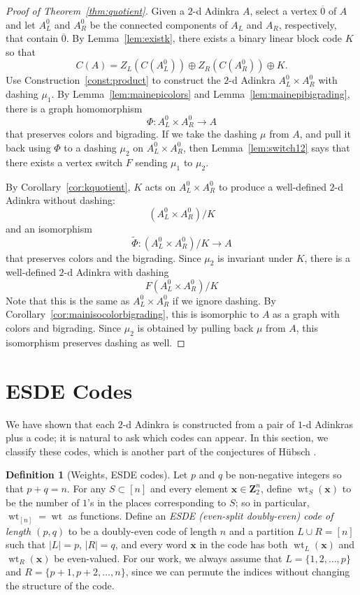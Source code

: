 \documentclass[12pt,twoside,singlespace]{article}
\numberwithin{equation}{section}
\theoremstyle{definition}
\newtheorem{definition}[equation]{Definition}
\newcommand{\ZZ}{\mathbf{Z}}
\newcommand{\on}{\operatorname}
\newcommand{\wt}{\on{wt}}
\renewcommand{\vec}[1]{\mathbf{#1}}
\begin{document}
\begin{proof}[Proof of Theorem~\ref{thm:quotient}]
Given a $2$-d Adinkra $A$, select a vertex $\overline{0}$ of $A$ and let $A_L^0$ and $A_R^0$ be the connected components of $A_L$ and $A_R$, respectively, that contain $\overline{0}$.  By Lemma~\ref{lem:existk}, there exists a binary linear block code $K$ so that
\[C(A)=Z_L(C(A_L^0))\oplus Z_R(C(A_R^0))\oplus K.
\]
Use Construction~\ref{const:product} to construct the $2$-d Adinkra $A_L^0\times A_R^0$ with dashing $\mu_1$.
By Lemma~\ref{lem:mainepicolors} and Lemma~\ref{lem:mainepibigrading}, there is a graph homomorphism
\[\Phi:A_L^0\times A_R^0 \to A\]
that preserves colors and bigrading.  If we take the dashing $\mu$ from $A$, and pull it back using $\Phi$ to a dashing $\mu_2$ on $A_L^0\times A_R^0$, then Lemma~\ref{lem:switch12} says that there exists a vertex switch $F$ sending $\mu_1$ to $\mu_2$.

By Corollary~\ref{cor:kquotient}, $K$ acts on $A_L^0\times A_R^0$ to produce a well-defined $2$-d Adinkra without dashing:
\[(A_L^0\times A_R^0)/K\]
and an isomorphism
\[\tilde{\Phi}:(A_L^0\times A_R^0)/K\to A\]
that preserves colors and the bigrading.  Since $\mu_2$ is invariant under $K$, there is a well-defined $2$-d Adinkra with dashing
\[F(A_L^0\times A_R^0)/K\]
Note that this is the same as $A_L^0\times A_R^0$ if we ignore dashing.  By Corollary~\ref{cor:mainisocolorbigrading}, this is isomorphic to $A$ as a graph with colors and bigrading.  Since $\mu_2$ is obtained by pulling back $\mu$ from $A$, this isomorphism preserves dashing as well.
\end{proof}

\color{black}

\section{ESDE Codes}

We have shown that each $2$-d Adinkra is constructed from a pair of $1$-d Adinkras plus a code; it is natural to ask which codes can appear. In this section, we classify these codes, which is another part of the conjectures of H\"ubsch \cite{hubsch:weaving}. 

\begin{definition}[Weights, ESDE codes]
Let $p$ and $q$ be non-negative integers so that $p+q=n$. For any $S \subset [n]$ and every element $\vec{x} \in \ZZ_2^n$, define $\wt_S(\vec{x})$ to be the number of $1$'s in the places corresponding to $S$; so in particular, $\wt_{[n]} = \wt$ as functions. Define an \emph{ESDE (even-split doubly-even) code of length $(p,q)$} to be a doubly-even code of length $n$ and a partition $L \cup R = [n]$ such that $|L| = p$, $|R| = q$, and every word $\vec{x}$ in the code has both $\wt_L(\vec{x})$ and $\wt_R(\vec{x})$ be even-valued. For our work, we always assume that $L = \{1, 2, \ldots, p\}$ and $R = \{p+1, p+2, \ldots, n\}$, since we can permute the indices without changing the structure of the code.
\end{definition}
\end{document}
